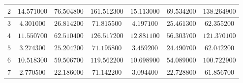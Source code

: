 \begin{landscape}
\begin{tabular}{|c|c|c|c|c|c|c|}
$2$          & $14.571000$                                                  & $76.504800$                                                  & $161.512300$                                                 & $15.113000$                                                        & $69.534200$                                                        & \multicolumn{1}{c|}{$138.264900$}                                                       \\ \hline
$3$          & $4.301000$                                                   & $26.814200$                                                  & $71.815500$                                                  & $4.197100$                                                         & $25.461300$                                                        & \multicolumn{1}{c|}{$62.355200$}                                                        \\ \hline
$4$          & $11.550700$                                                  & $62.510400$                                                  & $126.517200$                                                 & $12.881100$                                                        & $56.303700$                                                        & \multicolumn{1}{c|}{$121.370100$}                                                       \\ \hline
$5$          & $3.274300$                                                   & $25.204200$                                                  & $71.195800$                                                  & $3.459200$                                                         & $24.490700$                                                        & \multicolumn{1}{c|}{$62.042200$}                                                        \\ \hline
$6$          & $10.518300$                                                  & $59.506700$                                                  & $119.562200$                                                 & $10.698900$                                                        & $54.089000$                                                        & \multicolumn{1}{c|}{$100.722900$}                                                       \\ \hline
$7$          & $2.770500$                                                   & $22.186000$                                                  & $71.142200$                                                  & $3.094400$                                                         & $22.728800$                                                        & \multicolumn{1}{c|}{$61.856700$}                                                        \\ \hline

\end{tabular}
\end{landscape}
